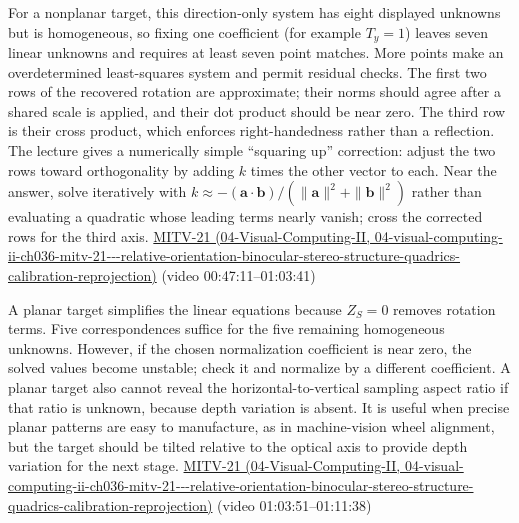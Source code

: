 For a nonplanar target, this direction-only system has eight displayed unknowns but is homogeneous, so fixing one coefficient (for example \(T_y=1\)) leaves seven linear unknowns and requires at least seven point matches. More points make an overdetermined least-squares system and permit residual checks. The first two rows of the recovered rotation are approximate; their norms should agree after a shared scale is applied, and their dot product should be near zero. The third row is their cross product, which enforces right-handedness rather than a reflection. The lecture gives a numerically simple ``squaring up'' correction: adjust the two rows toward orthogonality by adding \(k\) times the other vector to each. Near the answer, solve iteratively with \(k\approx-(\mathbf{a}\cdot\mathbf{b})/(\|\mathbf{a}\|^2+\|\mathbf{b}\|^2)\) rather than evaluating a quadratic whose leading terms nearly vanish; cross the corrected rows for the third axis. \href{../04-Visual-Computing-II/main.pdf\#nameddest=04-visual-computing-ii-ch036-mitv-21---relative-orientation-binocular-stereo-structure-quadrics-calibration-reprojection}{MITV-21 (04-Visual-Computing-II, 04-visual-computing-ii-ch036-mitv-21-\/-\/-relative-orientation-binocular-stereo-structure-quadrics-calibration-reprojection)} (video 00:47:11--01:03:41)

A planar target simplifies the linear equations because \(Z_S=0\) removes rotation terms. Five correspondences suffice for the five remaining homogeneous unknowns. However, if the chosen normalization coefficient is near zero, the solved values become unstable; check it and normalize by a different coefficient. A planar target also cannot reveal the horizontal-to-vertical sampling aspect ratio if that ratio is unknown, because depth variation is absent. It is useful when precise planar patterns are easy to manufacture, as in machine-vision wheel alignment, but the target should be tilted relative to the optical axis to provide depth variation for the next stage. \href{../04-Visual-Computing-II/main.pdf\#nameddest=04-visual-computing-ii-ch036-mitv-21---relative-orientation-binocular-stereo-structure-quadrics-calibration-reprojection}{MITV-21 (04-Visual-Computing-II, 04-visual-computing-ii-ch036-mitv-21-\/-\/-relative-orientation-binocular-stereo-structure-quadrics-calibration-reprojection)} (video 01:03:51--01:11:38)

